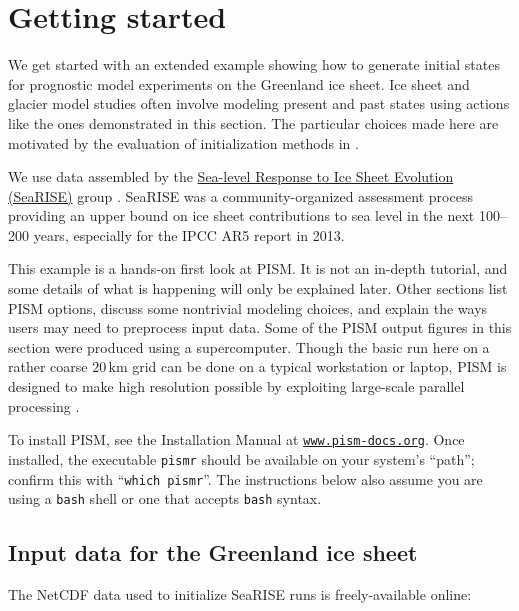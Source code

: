 
\section{Getting started}\label{sec:start}

We get started with an extended example showing how to generate initial states for prognostic model experiments on the Greenland ice sheet.  Ice sheet and glacier model studies often involve modeling present and past states using actions like the ones demonstrated in this section.  The particular choices made here are motivated by the evaluation of initialization methods in \cite{AschwandenAdalgeirsdottirKhroulev}.

We use data assembled by the \href{http://websrv.cs.umt.edu/isis/index.php/SeaRISE_Assessment}{Sea-level Response to Ice Sheet Evolution (SeaRISE)} group \cite{Bindschadler2013SeaRISE}.  SeaRISE was a community-organized assessment process providing an upper bound on ice sheet contributions to sea level in the next 100--200 years, especially for the IPCC AR5 report in 2013.

This example is a hands-on first look at PISM.  It is not an in-depth tutorial, and some details of what is happening will only be explained later.  Other sections list PISM options, discuss some nontrivial modeling choices, and explain the ways users may need to preprocess input data.  Some of the PISM output figures in this section were produced using a supercomputer.  Though the basic run here on a rather coarse $20\,\textrm{km}$ grid can be done on a typical workstation or laptop, PISM is designed to make high resolution possible by exploiting large-scale parallel processing \cite[among many other examples]{AschwandenAdalgeirsdottirKhroulev,Golledgeetal2012,Golledgeetal2013}.

To install PISM, see the Installation Manual at \href{http://www.pism-docs.org}{\texttt{www.pism-docs.org}}.
Once installed, the executable \texttt{pismr} should be available on your system's ``path''; confirm this with ``\texttt{which pismr}''.  The instructions below also assume you are using a \texttt{bash} shell or one that accepts \texttt{bash} syntax.


\subsection{Input data for the Greenland ice sheet}

The NetCDF data used to initialize SeaRISE runs is freely-available online: 
\medskip

